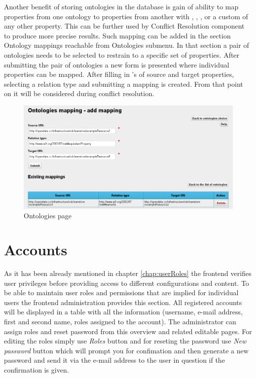 Another benefit of storing ontologies in the database is gain of ability to map properties from one ontology to properties from another with , , ,  or a custom  of any other property. This can be further used by Conflict Resolution component to produce more precise results. Such mapping can be added in the section Ontology mappings reachable from Ontologies submenu.
In that section a pair of ontologies needs to be selected to restrain to a specific set of properties. After submitting the pair of ontologies a new form is presented where individual properties can be mapped. After filling in 's of source and target properties, selecting a relation type and submitting a mapping is created. From that point on it will be considered during conflict resolution.

\begin{figure}[!ht]
    \centering
    \includegraphics[width=\textwidth]{images/fe-ontology-mappings.png}
    \caption{Ontologies page}
	\label{fig:feOntologyMappings}
\end{figure}

\section{Accounts}

As it has been already mentioned in chapter \ref{chap:userRoles} the frontend verifies user privileges before providing access to different configurations and content. To be able to maintain user roles and permissions that are implied for individual users the frontend administration provides this section. All registered accounts will be displayed in a table with all the information (username, e-mail address, first and second name, roles assigned to the account). 
The administrator can assign roles and reset password from this overview and related editable pages. For editing the roles simply use \emph{Roles} button and for reseting the password use \emph{New password} button which will prompt you for confimation and then generate a new password and send it via the e-mail address to the user in question if the confirmation is given.

